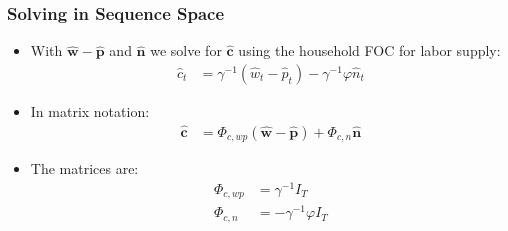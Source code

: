 \documentclass[english,xcolor=svgnames]{beamer}
\begin{document}
	
	\begin{frame}
		\frametitle{Solving in Sequence Space}
			\begin{itemize}
				\item With $\mathbf{\hat{w}-\hat{p}}$ and $\mathbf{\hat{n}}$  we solve for $\mathbf{\hat{c}}$ using the household FOC for labor supply:
				\begin{align*}
					 \hat{c}_t  &= \gamma^{-1}(\hat{w}_t - \hat{p}_t)- \gamma^{-1}\varphi \hat{n}_t   
				\end{align*}
				\item In matrix notation:
				\begin{align*}
					\mathbf{\hat{c}} &= \Phi_{c,wp}(\mathbf{\hat{w}-\hat{p}}) + \Phi_{c,n}\mathbf{\hat{n}}  
				\end{align*}
				\item The matrices are:
				\begin{align*}
					\Phi_{c,wp}&=\gamma^{-1}I_T \\
					\Phi_{c,n}&=-\gamma^{-1} \varphi I_T
				\end{align*}
			\end{itemize}
	\end{frame}
	
	
	
\end{document}
